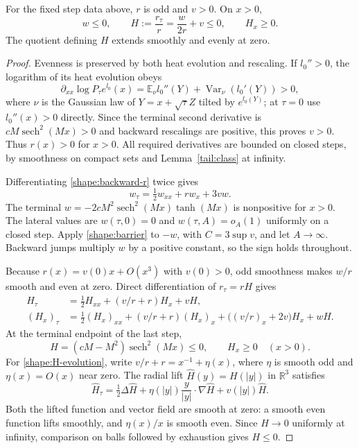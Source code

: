 \begin{lemma}\label{shape:backward}
For the fixed step data above, $r$ is odd and $v>0$.  On $x>0$,
\begin{equation}\label{shape:backward-signs}
 w\le0,\qquad
 H:=\frac{r_\tau}{r}=\frac{w}{2r}+v\le0,
 \qquad H_x\ge0.
\end{equation}
The quotient defining $H$ extends smoothly and evenly at zero.
\end{lemma}

\begin{proof}
Evenness is preserved by both heat evolution and rescaling.  If $l_0''>0$,
the logarithm of its heat evolution obeys
\[
 \partial_{xx}\log P_\tau e^{l_0}(x)
 =\mathbb E_\nu l_0''(Y)
     +\operatorname{Var}_\nu(l_0'(Y))>0,
\]
where $\nu$ is the Gaussian law of $Y=x+\sqrt\tau Z$ tilted by
$e^{l_0(Y)}$; at $\tau=0$ use $l_0''(x)>0$ directly.  Since the terminal
second derivative is $cM\operatorname{sech}^2(Mx)>0$ and backward
rescalings are positive, this proves $v>0$.  Thus $r(x)>0$ for $x>0$.
All required derivatives are bounded on closed steps, by smoothness on
compact sets and Lemma~\ref{tail:class} at infinity.

Differentiating \eqref{shape:backward-r} twice gives
\[
 w_\tau=\tfrac12w_{xx}+r w_x+3v w.
\]
The terminal $w=-2cM^2\operatorname{sech}^2(Mx)\tanh(Mx)$ is
nonpositive for $x>0$.  The lateral values are $w(\tau,0)=0$ and
$w(\tau,A)=o_A(1)$ uniformly on a closed step.  Apply
\eqref{shape:barrier} to $-w$, with $C=3\sup v$, and let $A\to\infty$.
Backward jumps multiply $w$ by a positive constant, so the sign holds
throughout.

Because $r(x)=v(0)x+O(x^3)$ with $v(0)>0$, odd smoothness makes
$w/r$ smooth and even at zero.  Direct differentiation of
$r_\tau=rH$ gives
\begin{align}
 H_\tau&=\tfrac12H_{xx}+(v/r+r)H_x+vH,
     \label{shape:H-evolution}\\
 (H_x)_\tau&=\tfrac12(H_x)_{xx}+(v/r+r)(H_x)_x
       +\bigl((v/r)_x+2v\bigr)H_x+wH.
     \label{shape:Hx-evolution}
\end{align}
At the terminal endpoint of the last step,
\[
 H=(cM-M^2)\operatorname{sech}^2(Mx)\le0,
 \qquad H_x\ge0\quad(x>0).
\]
For \eqref{shape:H-evolution}, write
$v/r+r=x^{-1}+\eta(x)$, where $\eta$ is smooth odd and $\eta(x)=O(x)$
near zero.  The radial lift $\widehat H(y)=H(|y|)$ in $\mathbb R^3$
satisfies
\[
 \widehat H_\tau=\tfrac12\Delta\widehat H
       +\eta(|y|)\frac y{|y|}\cdot\nabla\widehat H+v(|y|)\widehat H.
\]
Both the lifted function and vector field are smooth at zero: a smooth
even function lifts smoothly, and $\eta(x)/x$ is smooth even.
Since $H\to0$ uniformly at infinity, comparison on balls followed by
exhaustion gives $H\le0$.


\end{proof}
